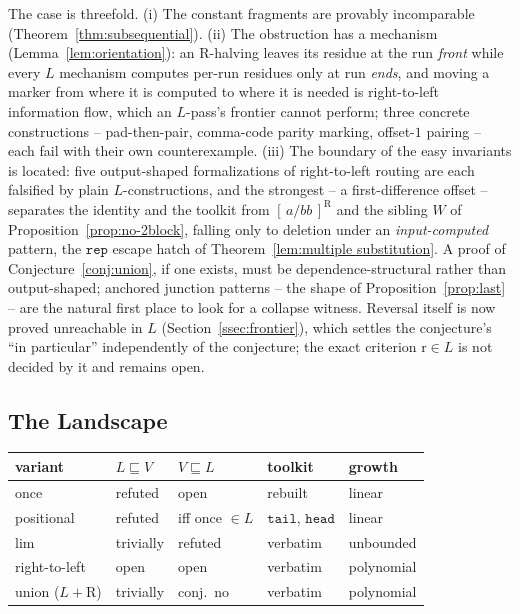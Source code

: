 \documentclass[runningheads,envcountsect]{llncs}
\begin{document}
The case is threefold. (i) The constant fragments are provably incomparable (Theorem~\ref{thm:subsequential}). (ii) The obstruction has a mechanism (Lemma~\ref{lem:orientation}): an $\mathrm{R}$-halving leaves its residue at the run \emph{front} while every $L$ mechanism computes per-run residues only at run \emph{ends}, and moving a marker from where it is computed to where it is needed is right-to-left information flow, which an $L$-pass's frontier cannot perform; three concrete constructions -- pad-then-pair, comma-code parity marking, offset-$1$ pairing -- each fail with their own counterexample. (iii) The boundary of the easy invariants is located: five output-shaped formalizations of right-to-left routing are each falsified by plain $L$-constructions, and the strongest -- a first-difference offset -- separates the identity and the toolkit from $[\,a/bb\,]^{\mathrm{R}}$ and the sibling $W$ of Proposition~\ref{prop:no-2block}, falling only to deletion under an \emph{input-computed} pattern, the $\mathtt{rep}$ escape hatch of Theorem~\ref{lem:multiple substitution}. A proof of Conjecture~\ref{conj:union}, if one exists, must be dependence-structural rather than output-shaped; anchored junction patterns -- the shape of Proposition~\ref{prop:last} -- are the natural first place to look for a collapse witness. Reversal itself is now proved unreachable in $L$ (Section~\ref{ssec:frontier}), which settles the conjecture's ``in particular'' independently of the conjecture; the exact criterion $\mathrm{r} \in L$ is not decided by it and remains open.

\subsection{The Landscape}

\begin{center}
\footnotesize
\begin{tabular}{l|llll}
    variant & $L \sqsubseteq V$ & $V \sqsubseteq L$ & toolkit & growth \\
    \hline
    once & refuted & open & rebuilt & linear \\
    positional & refuted & iff once $\in L$ & $\mathtt{tail}$, $\mathtt{head}$ & linear \\
    $\mathrm{lim}$ & trivially & refuted & verbatim & unbounded \\
    right-to-left & open & open & verbatim & polynomial \\
    union ($L{+}\mathrm{R}$) & trivially & conj.\ no & verbatim & polynomial
\end{tabular}
\end{center}
\end{document}
